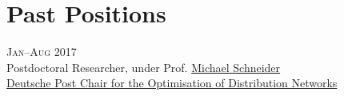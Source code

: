 \section*{Past Positions}

\begin{paracol}{2}
  \textsc{Jan--Aug 2017}
\switchcolumn
  \\
  Postdoctoral Researcher, under Prof. \href{http://www.dpo.rwth-aachen.de/cms/DPO/Der-Lehrstuhl/Team/Lehrstuhlleitung/~nwkh/Michael-Schneider/lidx/1/}{Michael Schneider}\\
  \href{http://www.dpor.rwth-aachen.de/}{Deutsche Post Chair for the Optimisation of Distribution Networks}
\end{paracol}